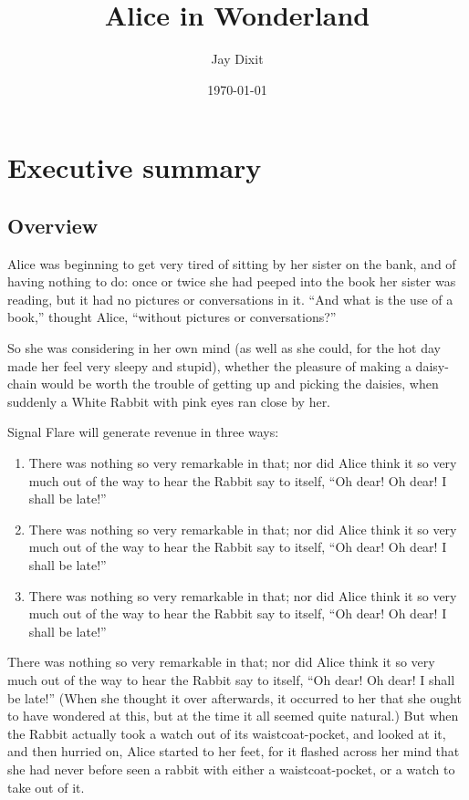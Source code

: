 \documentclass[12pt]{article}
\author{Jay Dixit}
\date{\today}
\title{Alice in Wonderland}
\def\maketitle{ \newgeometry{margin=1in} \thispagestyle{empty} \vfill \null \cleardoublepage\restoregeometry}
\begin{document}
\maketitle
\tableofcontents
\newpage


\section{Executive summary}
\label{sec-1}
\subsection{Overview}
\label{sec-1-1}
Alice was beginning to get very tired of sitting by her sister on the bank, and of having nothing to do: once or twice she had peeped into the book her sister was reading, but it had no pictures or conversations in it. ``And what is the use of a book,'' thought Alice, ``without pictures or conversations?'' 

So she was considering in her own mind (as well as she could, for the hot day made her feel very sleepy and stupid), whether the pleasure of making a daisy-chain would be worth the trouble of getting up and picking the daisies, when suddenly a White Rabbit with pink eyes ran close by her. 

Signal Flare will generate revenue in three ways: 
\begin{enumerate}
\item There was nothing so very remarkable in that; nor did Alice think it so very much out of the way to hear the Rabbit say to itself, ``Oh dear! Oh dear! I shall be late!''
\item There was nothing so very remarkable in that; nor did Alice think it so very much out of the way to hear the Rabbit say to itself, ``Oh dear! Oh dear! I shall be late!''
\item There was nothing so very remarkable in that; nor did Alice think it so very much out of the way to hear the Rabbit say to itself, ``Oh dear! Oh dear! I shall be late!''
\end{enumerate}

There was nothing so very remarkable in that; nor did Alice think it so very much out of the way to hear the Rabbit say to itself, ``Oh dear! Oh dear! I shall be late!'' (When she thought it over afterwards, it occurred to her that she ought to have wondered at this, but at the time it all seemed quite natural.) But when the Rabbit actually took a watch out of its waistcoat-pocket, and looked at it, and then hurried on, Alice started to her feet, for it flashed across her mind that she had never before seen a rabbit with either a waistcoat-pocket, or a watch to take out of it. 
\end{document}
